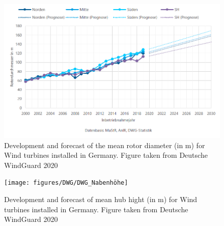 \documentclass[a4paper,11pt]{article}
\begin{document}
\begin{figure}

{\centering \includegraphics[width=1\linewidth]{figures/DWG/DWG_Rotordurchmesser} 

}

\caption{Development and forecast of the mean rotor diameter (in m) for Wind turbines installed in Germany. Figure taken from Deutsche WindGuard 2020}\label{fig:rotor}
\end{figure}
\begin{figure}[H]

{\centering \texttt{[image: figures/DWG/DWG\_Nabenhöhe]} 

}

\caption{Development and forecast of mean hub hight (in m) for Wind turbines installed in Germany. Figure taken from Deutsche WindGuard 2020}\label{fig:nabe}
\end{figure}
\end{document}
